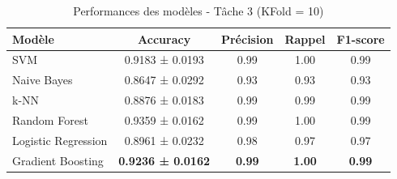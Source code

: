\begin{table}[H]
    \centering
    \caption{Performances des modèles - Tâche 3 (KFold = 10)}
    \begin{tabular}{lcccc}
        \toprule
        Modèle & Accuracy & Précision & Rappel & F1-score \\
        \midrule
        SVM & 0.9183 ± 0.0193 & 0.99 & 1.00 & 0.99 \\
        Naive Bayes & 0.8647 ± 0.0292 & 0.93 & 0.93 & 0.93 \\
        k-NN & 0.8876 ± 0.0183 & 0.99 & 0.99 & 0.99 \\
        Random Forest & 0.9359 ± 0.0162 & 0.99 & 1.00 & 0.99 \\
        Logistic Regression & 0.8961 ± 0.0232 & 0.98 & 0.97 & 0.97 \\
        Gradient Boosting & \textbf{0.9236 ± 0.0162} & \textbf{0.99} & \textbf{1.00} & \textbf{0.99} \\
        \bottomrule
    \end{tabular}\label{tab:model_comparison_clmref_context}
\end{table}

